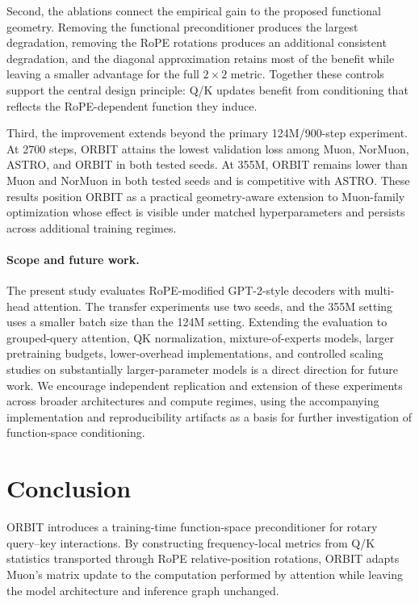 \documentclass[10pt]{article}
\begin{document}
Second, the ablations connect the empirical gain to the proposed functional geometry.
Removing the functional preconditioner produces the largest degradation, removing the RoPE
rotations produces an additional consistent degradation, and the diagonal approximation
retains most of the benefit while leaving a smaller advantage for the full $2\times2$
metric. Together these controls support the central design principle: Q/K updates benefit
from conditioning that reflects the RoPE-dependent function they induce.

Third, the improvement extends beyond the primary 124M/900-step experiment. At 2700 steps,
ORBIT attains the lowest validation loss among Muon, NorMuon, ASTRO, and ORBIT in both
tested seeds. At 355M, ORBIT remains lower than Muon and NorMuon in both tested seeds and is
competitive with ASTRO. These results position ORBIT as a practical geometry-aware
extension to Muon-family optimization whose effect is visible under matched hyperparameters
and persists across additional training regimes.

\paragraph{Scope and future work.}
The present study evaluates RoPE-modified GPT-2-style decoders with multi-head attention.
The transfer experiments use two seeds, and the 355M setting uses a smaller batch size than
the 124M setting. Extending the evaluation to grouped-query attention, QK normalization,
mixture-of-experts models, larger pretraining budgets, lower-overhead implementations, and
controlled scaling studies on substantially larger-parameter models is a direct direction
for future work. We encourage independent replication and extension of these experiments
across broader architectures and compute regimes, using the accompanying implementation
and reproducibility artifacts as a basis for further investigation of function-space
conditioning.

\section{Conclusion}
ORBIT introduces a training-time function-space preconditioner for rotary query--key
interactions. By constructing frequency-local metrics from Q/K statistics transported
through RoPE relative-position rotations, ORBIT adapts Muon's matrix update to the
computation performed by attention while leaving the model architecture and inference graph
unchanged.
\end{document}
